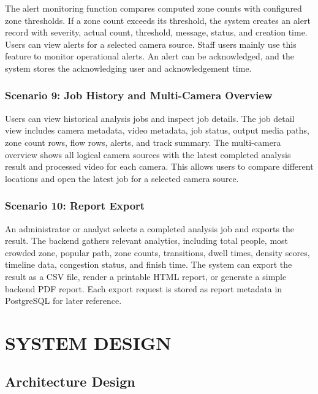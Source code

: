 \documentclass[12pt,a4paper]{report}
\begin{document}
The alert monitoring function compares computed zone counts with configured zone thresholds.
If a zone count exceeds its threshold, the system creates an alert record with severity, actual count, threshold, message, status, and creation time.
Users can view alerts for a selected camera source.
Staff users mainly use this feature to monitor operational alerts.
An alert can be acknowledged, and the system stores the acknowledging user and acknowledgement time.

\subsection*{Scenario 9: Job History and Multi-Camera Overview}

Users can view historical analysis jobs and inspect job details.
The job detail view includes camera metadata, video metadata, job status, output media paths, zone count rows, flow rows, alerts, and track summary.
The multi-camera overview shows all logical camera sources with the latest completed analysis result and processed video for each camera.
This allows users to compare different locations and open the latest job for a selected camera source.

\subsection*{Scenario 10: Report Export}

An administrator or analyst selects a completed analysis job and exports the result.
The backend gathers relevant analytics, including total people, most crowded zone, popular path, zone counts, transitions, dwell times, density scores, timeline data, congestion status, and finish time.
The system can export the result as a CSV file, render a printable HTML report, or generate a simple backend PDF report.
Each export request is stored as report metadata in PostgreSQL for later reference.

\chapter{SYSTEM DESIGN}

\section{Architecture Design}
\end{document}
